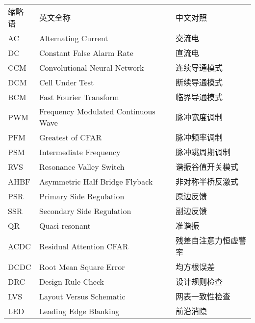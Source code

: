\begin{center}
{
\renewcommand{\arraystretch}{1.28}
\begin{tabular}{p{2.5cm}p{6cm}l}
    缩略语 & 英文全称 &  中文对照 \\
    AC &  Alternating Current& 交流电\\
    DC &Constant False Alarm Rate &直流电\\
    CCM & Convolutional Neural Network & 连续导通模式 \\
    DCM & Cell Under Test & 断续导通模式\\
    BCM & Fast Fourier Transform & 临界导通模式 \\
    PWM & Frequency Modulated Continuous Wave & 脉冲宽度调制 \\
    PFM &  Greatest of CFAR & 脉冲频率调制\\
    PSM & Intermediate Frequency & 脉冲跳周期调制 \\
    RVS & Resonance Valley Switch & 谐振谷值开关模式\\
    AHBF& Asymmetric Half Bridge Flyback& 非对称半桥反激式\\
    PSR&  Primary Side Regulation & 原边反馈\\
    SSR &  Secondary Side Regulation & 副边反馈\\
    QR & Quasi-resonant & 准谐振\\
    ACDC &  Residual Attention CFAR & 残差自注意力恒虚警率\\
    DCDC & Root Mean Square Error & 均方根误差\\
    DRC & Design Rule Check & 设计规则检查\\
    LVS &  Layout Versus Schematic & 网表一致性检查\\
    LED & Leading Edge Blanking & 前沿消隐\\
  
\end{tabular}
}
\end{center}
